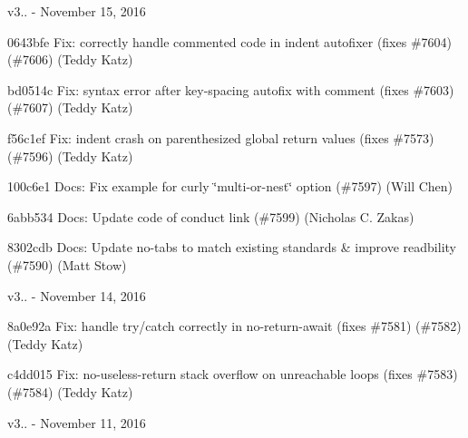 v3.. -\/ November 15, 2016


\begin{DoxyItemize}
\item 0643bfe Fix\+: correctly handle commented code in {\ttfamily indent} autofixer (fixes \#7604) (\#7606) (Teddy Katz)
\item bd0514c Fix\+: syntax error after {\ttfamily key-\/spacing} autofix with comment (fixes \#7603) (\#7607) (Teddy Katz)
\item f56c1ef Fix\+: {\ttfamily indent} crash on parenthesized global return values (fixes \#7573) (\#7596) (Teddy Katz)
\item 100c6e1 Docs\+: Fix example for curly \char`\"{}multi-\/or-\/nest\char`\"{} option (\#7597) (Will Chen)
\item 6abb534 Docs\+: Update code of conduct link (\#7599) (Nicholas C. Zakas)
\item 8302cdb Docs\+: Update no-\/tabs to match existing standards \& improve readbility (\#7590) (Matt Stow)
\end{DoxyItemize}

v3.. -\/ November 14, 2016


\begin{DoxyItemize}
\item 8a0e92a Fix\+: handle try/catch correctly in {\ttfamily no-\/return-\/await} (fixes \#7581) (\#7582) (Teddy Katz)
\item c4dd015 Fix\+: no-\/useless-\/return stack overflow on unreachable loops (fixes \#7583) (\#7584) (Teddy Katz)
\end{DoxyItemize}

v3.. -\/ November 11, 2016


